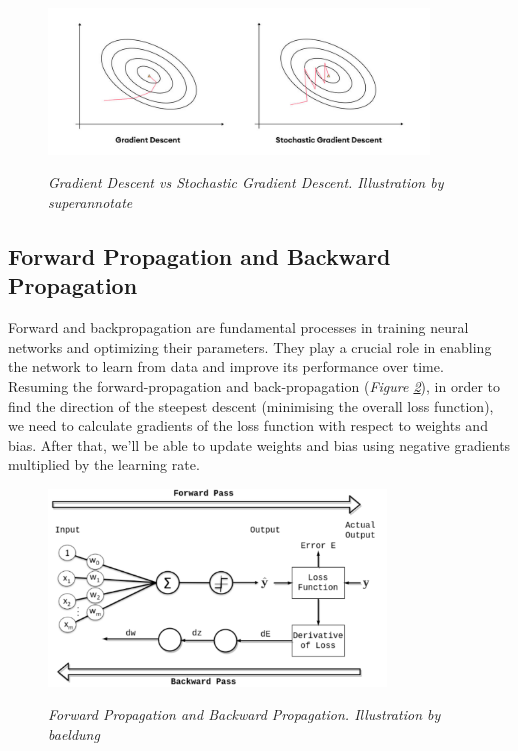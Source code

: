 \begin{itemize}
\begin{figure}[H]
\centering
\begin{adjustbox}{trim=0cm 0cm 0cm 1cm, clip}
\includegraphics[width=0.9\textwidth]{imatges/preliminaries/sgdvsgd.jpeg}
\end{adjustbox}
    \caption[Gradient Descent vs Stochastic Gradient Descent]{\textit{Gradient Descent vs Stochastic Gradient Descent. Illustration by superannotate}}
{\label{fig:sgdvsgd}}
\end{figure}

\end{itemize}

\newpage

\subsection{Forward Propagation and Backward Propagation}

Forward and backpropagation are fundamental processes in training neural networks and optimizing their parameters. They play a crucial role in enabling the network to learn from data and improve its performance over time. \\

Resuming the forward-propagation and back-propagation (\textit{Figure \ref{fig:forward-and-back-propagation}}), in order to find the direction of the steepest descent (minimising the overall loss function), we need to calculate gradients of the loss function with respect to weights and bias. After that, we’ll be able to update weights and bias using negative gradients multiplied by the learning rate.

\begin{figure}[H]
\centering
\includegraphics[width=0.8\textwidth]{imatges/preliminaries/front-and-back-prop.png}
    \caption[Forward Propagation and Backward Propagation]{\textit{Forward Propagation and Backward Propagation. Illustration by baeldung}}
{\label{fig:forward-and-back-propagation}}
\end{figure}


